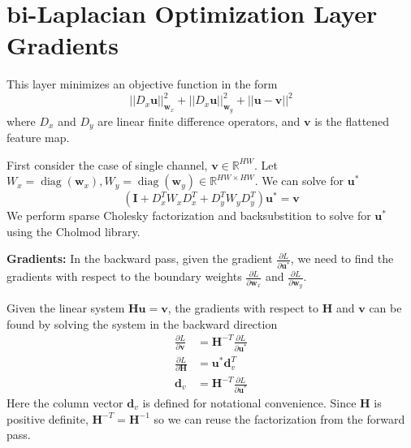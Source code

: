 \documentclass[final]{cvpr}
\DeclareMathOperator{\diag}{diag}
\begin{document}
\section{bi-Laplacian Optimization Layer Gradients}

This layer minimizes an objective function in the form
\begin{equation}
    ||D_x \mathbf{u}||_{\mathbf{w}_x}^2 + ||D_x \mathbf{u}||_{\mathbf{w}_y}^2 + ||\mathbf{u} - \mathbf{v}||^2
\end{equation}
where $D_x$ and $D_y$ are linear finite difference operators, and $\mathbf{v}$ is the flattened feature map. 

First consider the case of single channel, $\mathbf{v}\in \mathbb{R}^{HW}$. Let $W_x = \diag(\mathbf{w}_x), W_y = \diag(\mathbf{w}_y) \in \mathbb{R}^{HW\times HW}$. We can solve for $\mathbf{u}^*$ 
\begin{equation}
    (\mathbf{I} + D_x^T W_x D_x^T + D_y^T W_y D_y^T)\mathbf{u}^* = \mathbf{v}
    \label{eqn:pooling}
\end{equation}
We perform sparse Cholesky factorization and backsubstition to solve for $\mathbf{u}^*$ using the Cholmod library\cite{chen2008algorithm}.

\vspace{1mm} \noindent \textbf{Gradients:} In the backward pass, given the gradient $\frac{\partial L}{\partial\mathbf{u}^*}$, we need to find the gradients with respect to the boundary weights $\frac{\partial L}{\partial\mathbf{w}_x}$ and $\frac{\partial L}{\partial\mathbf{w}_y}$.

Given the linear system $\mathbf{H} \mathbf{u} = \mathbf{v}$, the gradients with respect to $\mathbf{H}$ and $\mathbf{v}$ can be found by solving the system in the backward direction \cite{amos2017optnet}
\begin{align}
    \frac{\partial L}{\partial \mathbf{v}} &= \mathbf{H}^{-T} \frac{\partial L}{\partial\mathbf{u}^*} \\
    \frac{\partial L}{\partial \mathbf{H}} &= \mathbf{u}^* \mathbf{d}_v^T \\
    \mathbf{d}_v &= \mathbf{H}^{-T} \frac{\partial L}{\partial\mathbf{u}^*}
\end{align}
Here the column vector $\mathbf{d}_v$ is defined for notational convenience. Since $\mathbf{H}$ is positive definite,  $\mathbf{H}^{-T}=\mathbf{H}^{-1}$ so we can reuse the factorization from the forward pass.
\end{document}
